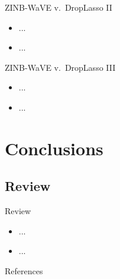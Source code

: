 \documentclass{beamer}
\begin{document}

\begin{frame}{ZINB-WaVE v.~DropLasso II}

\begin{itemize}
  \itemsep12pt
  \item ...
  \item ...
\end{itemize}

\end{frame}


\begin{frame}{ZINB-WaVE v.~DropLasso III}

\begin{itemize}
  \itemsep12pt
  \item ...
  \item ...
\end{itemize}

\end{frame}

\section{Conclusions}
\subsection{Review}

\begin{frame}{Review}

\begin{itemize}
  \itemsep12pt
  \item ...
  \item ...
\end{itemize}

\end{frame}


\setbeamercovered{}
\beamerdefaultoverlayspecification{}

\begin{frame}[c,allowframebreaks]{References}

\small

\nocite{*}

\itemize

\end{frame}

\end{document}
